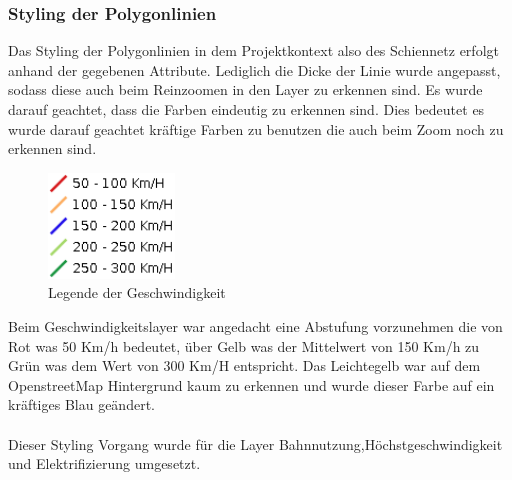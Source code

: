 \subsubsection{Styling der Polygonlinien}
Das Styling der Polygonlinien in dem Projektkontext also des Schiennetz erfolgt anhand der gegebenen Attribute. Lediglich die Dicke der Linie wurde angepasst, sodass diese auch beim Reinzoomen in den Layer zu erkennen sind. Es wurde darauf geachtet, dass die Farben eindeutig zu erkennen sind. Dies bedeutet es wurde darauf geachtet kräftige Farben zu benutzen die auch beim Zoom noch zu erkennen sind.  
\begin{figure}[h]
\centering
	\includegraphics[width=0.3\textwidth]{images/legend_g.png}
	\caption{Legende der Geschwindigkeit}
\end{figure}
Beim Geschwindigkeitslayer war angedacht eine Abstufung vorzunehmen die von Rot was 50 Km/h bedeutet, über Gelb was der Mittelwert von 150 Km/h zu Grün was dem Wert von 300 Km/H entspricht. Das Leichtegelb war auf dem OpenstreetMap Hintergrund kaum zu erkennen und wurde dieser Farbe auf ein kräftiges Blau geändert.
\\\\
Dieser Styling Vorgang wurde für die Layer Bahnnutzung,Höchstgeschwindigkeit und Elektrifizierung umgesetzt.
\pagebreak
